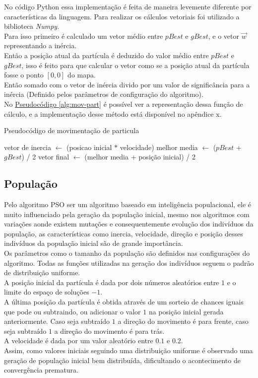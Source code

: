No código Python essa implementação é feita de maneira levemente diferente por características da linguagem. Para realizar os cálculos vetoriais foi utilizado a biblioteca \textit{Numpy}.\\
\indent Para isso primeiro é calculado um vetor médio entre $pBest$ e $gBest$, e o vetor $\vec w$ representando a inércia.\\
\indent Então a posição atual da partícula é deduzido do valor médio entre $pBest$ e $gBest$, isso é feito para que calcular o vetor como se a posição atual da partícula fosse o ponto $[0,0]$ do mapa.\\
Então somado com o vetor de inércia divido por um valor de significância para a inércia (Definido pelos parâmetros de configuração do algoritmo).\\
%
\indent No \hyperref[alg:mov-part]{Pseudocódigo \ref{alg:mov-part}} é possível ver a representação dessa função de cálculo, e a implementação desse método está disponível no apêndice x.
\begin{algorithm}
    \caption{Pseudocódigo de movimentação de particula}\label{alg:mov-part}
\begin{algorithmic}
\State vetor de inercia $\gets$ (posicao inicial $*$ velocidade)
\State melhor media $\gets$ ($pBest$ + $gBest$) / 2
\State vetor final $\gets$ (melhor media + posição inicial) / 2
\end{algorithmic}
\end{algorithm}
\subsection{População}
Pelo algoritmo PSO ser um algoritmo baseado em inteligência populacional, ele é muito influenciado pela geração da população inicial, mesmo nos algoritmos com variações aonde existem mutações e consequentemente evolução dos indivíduos da população, as características como inercia, velocidade, direção e posição desses indivíduos da população inicial são de grande importância.\\
\indent Os parâmetros como o tamanho da população são definidos nas configurações do algoritmo. Todas as funções utilizadas na geração dos indivíduos seguem o padrão de distribuição uniforme.\\
\indent A posição inicial da partícula é dada por dois números aleatórios entre $1$ e o limite do espaço de soluções $- 1$.\\
\indent A última posição da partícula é obtida através de um sorteio de chances iguais que pode ou subtraindo, ou adicionar o valor $1$ na posição inicial gerada anteriormente. Caso seja subtraído $1$ a direção do movimento é para frente, caso seja subtraído $1$ a direção do movimento é para trás.\\
\indent A velocidade é dada por um valor aleatório entre $0.1$ e $0.2$.\\
\indent Assim, como valores iniciais seguindo uma distribuição uniforme é observado uma geração de população inicial bem distribuída, dificultando o acontecimento de convergência prematura.

